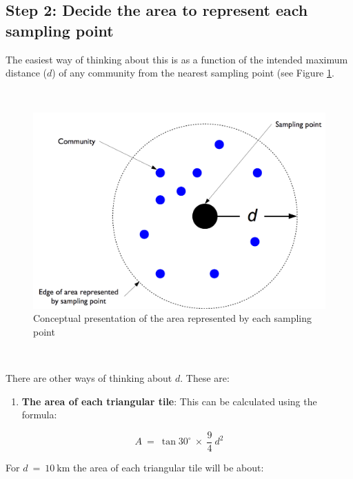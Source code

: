 \documentclass[12pt,a4paper]{book}
\providecommand{\tightlist}{%
  \setlength{\itemsep}{0pt}\setlength{\parskip}{0pt}}
\theoremstyle{definition}
\theoremstyle{definition}
\theoremstyle{definition}
\theoremstyle{remark}
\begin{document}
\newpage

\hypertarget{step-2-decide-the-area-to-represent-each-sampling-point}{%
\subsection{Step 2: Decide the area to represent each sampling
point}\label{step-2-decide-the-area-to-represent-each-sampling-point}}

The easiest way of thinking about this is as a function of the intended
maximum distance (\(d\)) of any community from the nearest sampling
point (see Figure \ref{fig:distance1}.

~

\begin{figure}[H]

{\centering \includegraphics[width=16.67in]{figures/step2} 

}

\caption{Conceptual presentation of the area represented by each sampling point}\label{fig:distance1}
\end{figure}

~

There are other ways of thinking about \(d\). These are:

\begin{enumerate}
\def\labelenumi{\arabic{enumi}.}
\tightlist
\item
  \textbf{The area of each triangular tile}: This can be calculated
  using the formula:
\end{enumerate}

\[ A ~ = ~ \tan30^ \circ ~ \times ~ \frac{9}{4} ~ d ^ 2 \]

For \(d ~ = ~ 10 ~ \text{km}\) the area of each triangular tile will be
about:
\end{document}
